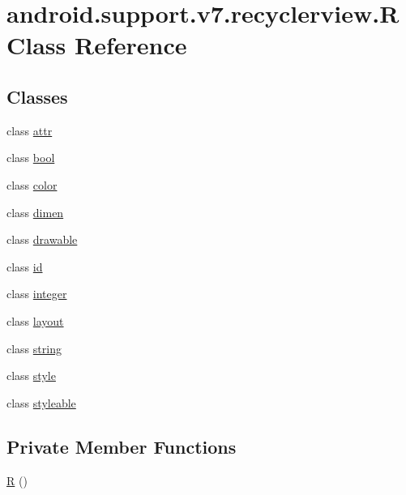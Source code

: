 \hypertarget{classandroid_1_1support_1_1v7_1_1recyclerview_1_1_r}{}\section{android.\+support.\+v7.\+recyclerview.\+R Class Reference}
\label{classandroid_1_1support_1_1v7_1_1recyclerview_1_1_r}
\subsection*{Classes}
\begin{DoxyCompactItemize}
\item 
class \mbox{\hyperlink{classandroid_1_1support_1_1v7_1_1recyclerview_1_1_r_1_1attr}{attr}}
\item 
class \mbox{\hyperlink{classandroid_1_1support_1_1v7_1_1recyclerview_1_1_r_1_1bool}{bool}}
\item 
class \mbox{\hyperlink{classandroid_1_1support_1_1v7_1_1recyclerview_1_1_r_1_1color}{color}}
\item 
class \mbox{\hyperlink{classandroid_1_1support_1_1v7_1_1recyclerview_1_1_r_1_1dimen}{dimen}}
\item 
class \mbox{\hyperlink{classandroid_1_1support_1_1v7_1_1recyclerview_1_1_r_1_1drawable}{drawable}}
\item 
class \mbox{\hyperlink{classandroid_1_1support_1_1v7_1_1recyclerview_1_1_r_1_1id}{id}}
\item 
class \mbox{\hyperlink{classandroid_1_1support_1_1v7_1_1recyclerview_1_1_r_1_1integer}{integer}}
\item 
class \mbox{\hyperlink{classandroid_1_1support_1_1v7_1_1recyclerview_1_1_r_1_1layout}{layout}}
\item 
class \mbox{\hyperlink{classandroid_1_1support_1_1v7_1_1recyclerview_1_1_r_1_1string}{string}}
\item 
class \mbox{\hyperlink{classandroid_1_1support_1_1v7_1_1recyclerview_1_1_r_1_1style}{style}}
\item 
class \mbox{\hyperlink{classandroid_1_1support_1_1v7_1_1recyclerview_1_1_r_1_1styleable}{styleable}}
\end{DoxyCompactItemize}
\subsection*{Private Member Functions}
\begin{DoxyCompactItemize}
\item 
\mbox{\hyperlink{classandroid_1_1support_1_1v7_1_1recyclerview_1_1_r_aa060a454ea7ef2c32580bebc95d5456f}{R}} ()
\end{DoxyCompactItemize}


